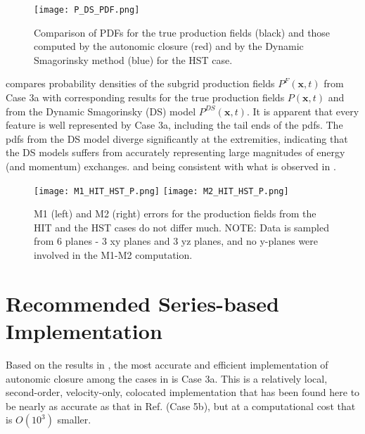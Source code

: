 %
\begin{figure}
	\begin{center}
	\texttt{[image: P\_DS\_PDF.png]}
	\caption{Comparison of PDFs for the true production fields (black) and those computed by the autonomic closure (red) and by the Dynamic Smagorinsky method (blue) for the HST case.}
	\label{F:PDF_HST}
	\end{center}
\end{figure}
%
%


 compares probability densities of the subgrid production fields $P^F(\mathbf{x},t)$ from Case 3a with corresponding results for the true production fields $P(\mathbf{x},t)$  and from the Dynamic Smagorinsky (DS) model $P^{DS}(\mathbf{x},t)$. It is apparent that every feature is well represented by Case 3a, including the tail ends of the pdfs. The pdfs from the DS model diverge significantly at the extremities, indicating that the DS models suffers from accurately representing large magnitudes of energy (and momentum) exchanges. and being consistent with what is observed in . 



%
\begin{figure}
	\begin{center}
	\texttt{[image: M1\_HIT\_HST\_P.png]}
	\texttt{[image: M2\_HIT\_HST\_P.png]}
	\caption{M1 (left) and M2 (right) errors for the production fields from the HIT and the HST cases do not differ much. NOTE: Data is sampled from 6 planes - 3 xy planes and 3 yz planes, and no y-planes were involved in the M1-M2 computation.}
	\label{F:M1M2_HST}
	\end{center}
\end{figure}
%
%



\section{Recommended  Series-based Implementation}
\label{sec:IVG}

Based on the results in , the most accurate and efficient implementation of autonomic closure among the cases in  is Case 3a. This is a relatively local, second-order, velocity-only, colocated implementation that has been found here to be nearly as accurate as that in Ref.  \cite{king2016autonomic} (Case 5b), but at a computational cost that is $O(10^3)$ smaller.  

